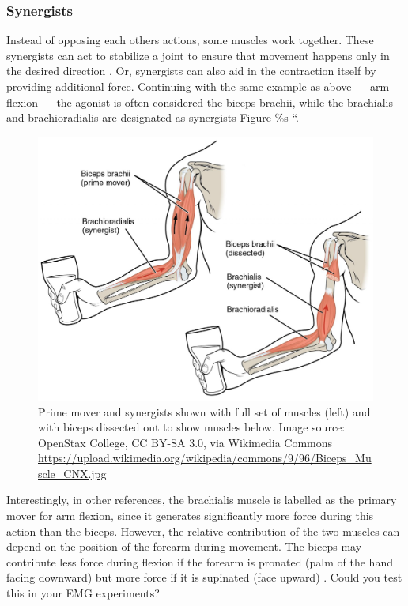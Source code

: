 \documentclass{article}
\begin{document}
\subsubsection{Synergists}

Instead of opposing each others actions, some muscles work together. These synergists can act to stabilize a joint to ensure that movement happens only in the desired direction \citep{openStax_lever, tortora2018principles}. Or, synergists can also aid in the contraction itself by providing additional force. Continuing with the same example as above --- arm flexion --- the agonist is often considered the biceps brachii, while the brachialis and brachioradialis are designated as synergists \citep{}Figure \%s ``.

\begin{figure}[!htbp]
\centering
\includegraphics[width=0.7\linewidth]{files/EPpXta8zJdzN048lz8AR-fd03158f8f707eff2762e4286dda7de0.png}
\caption[]{Prime mover and synergists shown with full set of muscles (left) and with biceps dissected out to show muscles below. Image source: OpenStax College, CC BY-SA 3.0, via Wikimedia Commons \href{https://upload.wikimedia.org/wikipedia/commons/9/96/Biceps\_Muscle\_CNX.jpg}{https://upload.wikimedia.org/wikipedia/commons/9/96/Biceps\_Muscle\_CNX.jpg}}
\label{lnZL7Lff4l}
\end{figure}

Interestingly, in other references, the brachialis muscle is labelled as the primary mover for arm flexion, since it generates significantly more force during this action than the biceps. However, the relative contribution of the two muscles can depend on the position of the forearm during movement. The biceps may contribute less force during flexion if the forearm is pronated (palm of the hand facing downward) but more force if it is supinated (face upward) \citep{mansfield2019structure, plantz2023back}. Could you test this in your EMG experiments?
\end{document}
